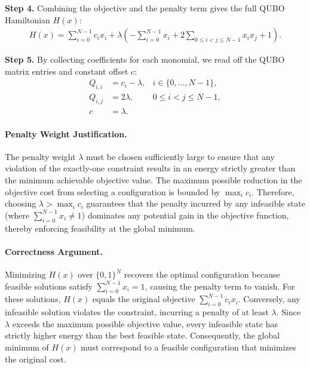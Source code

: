 \documentclass[12pt]{article}
\begin{document}
\textbf{Step 4.} Combining the objective and the penalty term gives the full QUBO Hamiltonian $H(x)$:
\begin{align}
H(x) = \sum_{i=0}^{N-1} c_i x_i + \lambda \left( -\sum_{i=0}^{N-1} x_i + 2 \sum_{0 \le i < j \le N-1} x_i x_j + 1 \right).
\end{align}

\textbf{Step 5.} By collecting coefficients for each monomial, we read off the QUBO matrix entries and constant offset $c$:
\begin{align}
Q_{i,i} &= c_i - \lambda, & i \in \{0, \dots, N-1\}, \\
Q_{i,j} &= 2\lambda, & 0 \le i < j \le N-1, \\
c &= \lambda.
\end{align}

\paragraph{Penalty Weight Justification.}
The penalty weight $\lambda$ must be chosen sufficiently large to ensure that any violation of the exactly-one constraint results in an energy strictly greater than the minimum achievable objective value. The maximum possible reduction in the objective cost from selecting a configuration is bounded by $\max_i c_i$. Therefore, choosing $\lambda > \max_i c_i$ guarantees that the penalty incurred by any infeasible state (where $\sum_{i=0}^{N-1} x_i \neq 1$) dominates any potential gain in the objective function, thereby enforcing feasibility at the global minimum.

\paragraph{Correctness Argument.}
Minimizing $H(x)$ over $\{0,1\}^N$ recovers the optimal configuration because feasible solutions satisfy $\sum_{i=0}^{N-1} x_i = 1$, causing the penalty term to vanish. For these solutions, $H(x)$ equals the original objective $\sum_{i=0}^{N-1} c_i x_i$. Conversely, any infeasible solution violates the constraint, incurring a penalty of at least $\lambda$. Since $\lambda$ exceeds the maximum possible objective value, every infeasible state has strictly higher energy than the best feasible state. Consequently, the global minimum of $H(x)$ must correspond to a feasible configuration that minimizes the original cost.
\end{document}
